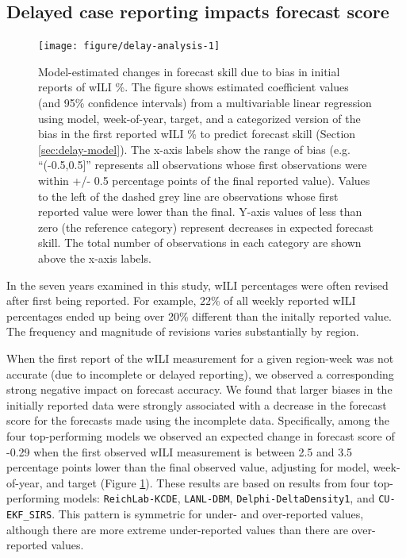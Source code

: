 \documentclass{article}\usepackage[]{graphicx}\usepackage[]{color}
\newenvironment{knitrout}{}{} %
\begin{document}
\subsection{Delayed case reporting impacts forecast score}\label{sec:delays}
\begin{knitrout}
\color{fgcolor}\begin{figure}
\texttt{[image: figure/delay-analysis-1]} \caption{Model-estimated changes in forecast skill due to bias in initial reports of wILI \%. The figure shows estimated coefficient values (and 95\% confidence intervals) from a multivariable linear regression using model, week-of-year, target, and a categorized version of the bias in the first reported wILI \% to predict forecast skill (Section \ref{sec:delay-model}).  The x-axis labels show the range of bias (e.g. ``(-0.5,0.5]'' represents all observations whose first observations were within +/- 0.5 percentage points of the final reported value). Values to the left of the dashed grey line are observations whose first reported value were lower than the final. Y-axis values of less than zero (the reference category) represent decreases in expected forecast skill. The total number of observations in each category are shown above the x-axis labels.}\label{fig:delay-analysis}
\end{figure}


\end{knitrout}

In the seven years examined in this study, wILI percentages were often revised after first being reported. For example, $22$\% of all weekly reported wILI percentages ended up being over 20\% different than the initally reported value.
The frequency and magnitude of revisions varies substantially by region.

When the first report of the wILI measurement for a given region-week was not accurate (due to incomplete or delayed reporting), we observed a corresponding strong negative impact on forecast accuracy.
We found that larger biases in the initially reported data were strongly associated with a decrease in the forecast score for the forecasts made using the incomplete data.
Specifically, among the four top-performing models we observed an expected change in forecast score of -0.29 
when the first observed wILI measurement is between 2.5 and 3.5 percentage points lower than the final observed value, adjusting for model, week-of-year, and target (Figure \ref{fig:delay-analysis}).
These results are based on results from four top-performing models: {\tt ReichLab-KCDE}, {\tt LANL-DBM}, {\tt Delphi-DeltaDensity1}, and {\tt CU-EKF\_SIRS}.
This pattern is symmetric for under- and over-reported values, although there are more extreme under-reported values than there are over-reported values. 
\end{document}
